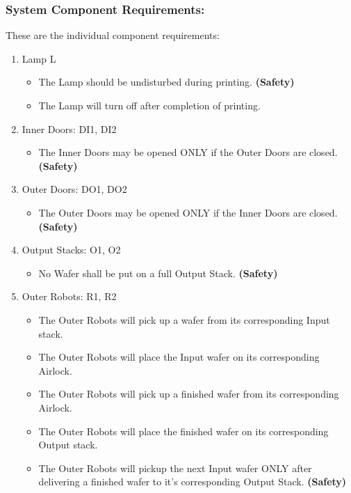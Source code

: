 \documentclass[a4paper,12pt]{article}
\begin{document}
\subsubsection{System Component Requirements:}
These are the individual component requirements:
\begin{enumerate}
\item Lamp L
	\begin{itemize}
	\item The Lamp should be undisturbed during printing.\textbf{ (Safety)}
	\item The Lamp will turn off after completion of printing.	
	\end{itemize}
\item Inner Doors: DI1, DI2
	\begin{itemize}
	\item The Inner Doors may be opened ONLY if the Outer Doors are closed. \textbf{ (Safety)}
	\end{itemize}

\item Outer Doors: DO1, DO2 
	\begin{itemize}
	\item The Outer Doors may be opened ONLY if the Inner Doors are closed. \textbf{ (Safety)}
	\end{itemize}

\item Output Stacks: O1, O2
	\begin{itemize}
	\item No Wafer shall be put on a full Output Stack.\textbf{ (Safety)}
	\end{itemize}

\item Outer Robots: R1, R2
	\begin{itemize}
	\item The Outer Robots will pick up a wafer from its corresponding Input stack.
	\item The Outer Robots will place the Input wafer on its corresponding Airlock.
	\item The Outer Robots will pick up a finished wafer from its corresponding Airlock.
	\item The Outer Robots will place the finished wafer on its corresponding Output stack.
	\item The Outer Robots will pickup the next Input wafer ONLY after delivering a finished wafer to it's corresponding Output Stack.\textbf{ (Safety)}
	\end{itemize}


\end{enumerate}
\end{document}
